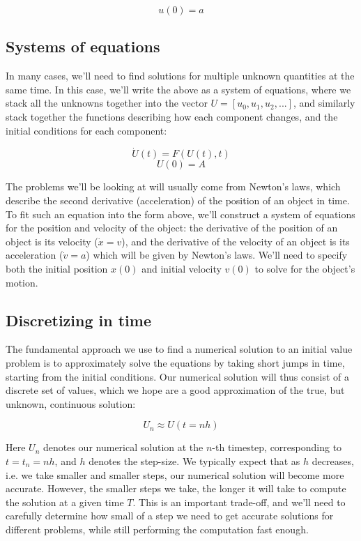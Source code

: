 \documentclass[main.tex]{subfiles}
\begin{document}
\begin{equation}
    u(0)=a
\end{equation}

\subsection{Systems of equations}

In many cases, we'll need to find solutions for multiple unknown quantities at the same time.
In this case, we'll write the above as a system of equations, where we stack all the unknowns together into the vector $U = [u_0, u_1, u_2, ...]$, and similarly stack together the functions describing how each component changes, and the initial conditions for each component:

\begin{equation}
    \dot{U}(t) = F(U(t), t)
\end{equation}
%
\begin{equation}
    U(0) = A
\end{equation}

The problems we'll be looking at will usually come from Newton's laws, which describe the second derivative (acceleration) of the position of an object in time.
To fit such an equation into the form above, we'll construct a system of equations for the position and velocity of the object: the derivative of the position of an object is its velocity ($\dot{x} = v$), and the derivative of the velocity of an object is its acceleration ($\dot{v} = a$) which will be given by Newton's laws.
We'll need to specify both the initial position $x(0)$ and initial velocity $v(0)$ to solve for the object's motion.

\subsection{Discretizing in time}

The fundamental approach we use to find a numerical solution to an initial value problem is to approximately solve the equations by taking short jumps in time, starting from the initial conditions.
Our numerical solution will thus consist of a discrete set of values, which we hope are a good approximation of the true, but unknown, continuous solution:

\begin{equation}
    U_n \approx U(t = n h)
\end{equation}

Here $U_n$ denotes our numerical solution at the $n$-th timestep, corresponding to $t = t_n = n h$, and $h$ denotes the step-size.
We typically expect that as $h$ decreases, i.e. we take smaller and smaller steps, our numerical solution will become more accurate.
However, the smaller steps we take, the longer it will take to compute the solution at a given time $T$.
This is an important trade-off, and we'll need to carefully determine how small of a step we need to get accurate solutions for different problems, while still performing the computation fast enough.
\end{document}
